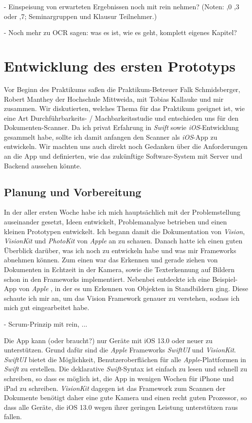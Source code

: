 \documentclass[nomenclature, 150]{HSMW-Thesis}
\begin{document}
	- Einspeisung von erwarteten Ergebnissen noch mit rein nehmen? (Noten: ,0 ,3 oder ,7; Seminargruppen und Klausur Teilnehmer.)
	
	- Noch mehr zu OCR sagen: was es ist, wie es geht, komplett eigenes Kapitel?


	
\chapter{Entwicklung des ersten Prototyps}
	Vor Beginn des Praktikums saßen die Praktikum-Betreuer Falk Schmidsberger, Robert Manthey der Hochschule Mittweida, mit Tobias Kallauke und mir zusammen. Wir diskutierten, welches Thema für das Praktikum geeignet ist, wie eine Art Durchführbarkeits- / Machbarkeitsstudie und entschieden uns für den Dokumenten-Scanner. Da ich privat Erfahrung in \textit{Swift} sowie \textit{iOS}-Entwicklung gesammelt habe, sollte ich damit anfangen den Scanner als \textit{iOS}-App zu entwickeln. Wir machten uns auch direkt noch Gedanken über die Anforderungen an die App und definierten, wie das zukünftige Software-System mit Server und Backend aussehen könnte.

	\section{Planung und Vorbereitung}
		In der aller ersten Woche habe ich mich hauptsächlich mit der Problemstellung auseinander gesetzt, Ideen entwickelt, Problemanalyse betrieben und einen kleinen Prototypen entwickelt. Ich begann damit die Dokumentation von \textit{Vision}, \textit{VisionKit} und \textit{PhotoKit} von \textit{Apple} an zu schauen. Danach hatte ich einen guten Überblick darüber, was ich noch zu entwickeln habe und was mir Frameworks abnehmen können. Zum einen war das Erkennen und gerade ziehen von Dokumenten in Echtzeit in der Kamera, sowie die Texterkennung auf Bildern schon in den Frameworks implementiert. Nebenbei entdeckte ich eine Beispiel-App von \textit{Apple} \cite{visionBasicApp}, in der es um Erkennen von Objekten in Standbildern ging. Diese schaute ich mir an, um das Vision Framework genauer zu verstehen, sodass ich mich gut eingearbeitet habe.
		
		- Scrum-Prinzip mit rein, ...
		
		Die App kann (oder braucht?) nur Geräte mit iOS 13.0 oder neuer zu unterstützen. Grund dafür sind die \textit{Apple} Frameworks \textit{SwiftUI} und \textit{VisionKit}. \textit{SwiftUI} bietet die Möglichkeit, Benutzeroberflächen für alle \textit{Apple}-Plattformen in \textit{Swift} zu erstellen. Die deklarative \textit{Swift}-Syntax ist einfach zu lesen und schnell zu schreiben, so dass es möglich ist, die App in wenigen Wochen für iPhone und iPad zu schreiben. \textit{VisionKit} dagegen ist das Framework zum Scannen der Dokumente benötigt daher eine gute Kamera und einen recht guten Prozessor, so dass alle Geräte, die iOS 13.0 wegen ihrer geringen Leistung unterstützen raus fallen.
	
\end{document}
